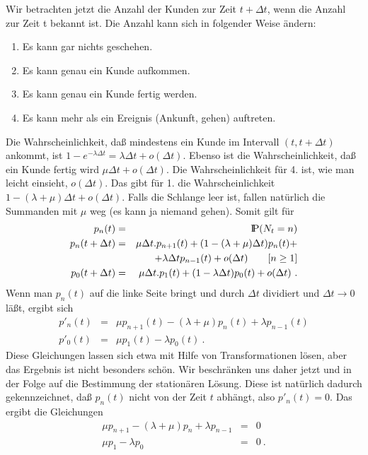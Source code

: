 Wir betrachten jetzt die Anzahl der Kunden zur Zeit $t+ \Delta t$, wenn
die Anzahl zur Zeit t bekannt ist. Die Anzahl kann sich in folgender Weise
ändern:
\begin{enumerate}
\item Es kann gar nichts geschehen.
\item Es kann genau ein Kunde aufkommen.
\item Es kann genau ein Kunde fertig werden.
\item Es kann mehr als ein Ereignis (Ankunft, gehen) auftreten.
\end{enumerate}
Die Wahrscheinlichkeit, daß mindestens ein Kunde im Intervall $(t, t+ \Delta t)$
ankommt, ist $1-e^{-\lambda \Delta t} = \lambda \Delta t + o (\Delta t)$.
Ebenso ist die Wahrscheinlichkeit, daß ein Kunde fertig wird $\mu \Delta
t + o(\Delta t)$. Die Wahrscheinlichkeit für 4. ist, wie man leicht
einsieht, $o(\Delta t)$. Das gibt für 1. die Wahrscheinlichkeit $1 -
(\lambda + \mu) \Delta t + o(\Delta t)$. Falls die Schlange leer ist,
fallen natürlich die Summanden mit $\mu$ weg (es kann ja niemand gehen).
Somit gilt für
\begin{eqnarray*}
p_{n}(t) &=& {\rm I\kern-0.2em P} (N_{t} = n) \\
p_{n}(t+ \Delta t) &=& \mu \Delta t . p_{n+1}(t) + (1 - (\lambda +
\mu) \Delta t) p_{n}(t) + \\
 & &+ \lambda \Delta t p_{n-1}(t) + o(\Delta t)
\qquad [n \geq 1] \\
p_{0}(t + \Delta t) &=& \mu \Delta t . p_{1}(t) + (1 - \lambda \Delta t)
p_{0}(t) + o(\Delta t) ~.
\end{eqnarray*}
Wenn man $p_{n}(t)$ auf die linke Seite bringt und durch $\Delta t$
dividiert und $\Delta t \rightarrow 0$ läßt, ergibt sich
\begin{eqnarray*}
p'_{n}(t) &=& \mu p_{n+1}(t)-(\lambda + \mu) p_{n}(t)+ \lambda p_{n-1}(t)
\\
p'_{0}(t) &=& \mu p_{1}(t)- \lambda p_{0}(t) ~.
\end{eqnarray*}
Diese Gleichungen lassen sich etwa mit Hilfe von Transformationen lösen,
aber das Ergebnis ist nicht besonders schön. Wir beschränken uns daher
jetzt und in der Folge auf die Bestimmung der stationären Lösung. Diese
ist natürlich dadurch gekennzeichnet, daß $p_{n}(t)$ nicht von der Zeit
$t$ abhängt, also $p'_{n}(t)=0$. Das ergibt die Gleichungen
\begin{eqnarray*}
\mu p_{n+1}-(\lambda +\mu) p_{n} + \lambda p_{n-1} &=& 0 \\
\mu p_{1} - \lambda p_{0} &=& 0 ~.
\end{eqnarray*}
